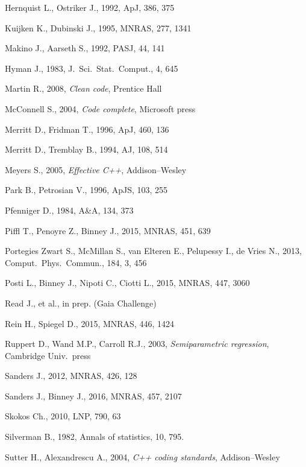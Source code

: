 \documentclass[12pt]{article}
\begin{document}
\begin{thebibliography}{99}
Hernquist L., Ostriker J., 1992, ApJ, 386, 375

Kuijken K., Dubinski J., 1995, MNRAS, 277, 1341

Makino J., Aarseth S., 1992, PASJ, 44, 141

Hyman J., 1983, J.~Sci.~Stat.~Comput., 4, 645

Martin R., 2008, \textsl{Clean code}, Prentice Hall

McConnell S., 2004, \textsl{Code complete}, Microsoft press

Merritt D., Fridman T., 1996, ApJ, 460, 136

Merritt D., Tremblay B., 1994, AJ, 108, 514

Meyers S., 2005, \textsl{Effective C++}, Addison--Wesley

Park B., Petrosian V., 1996, ApJS, 103, 255

Pfenniger D., 1984, A\&A, 134, 373

Piffl T., Penoyre Z., Binney J., 2015, MNRAS, 451, 639

Portegies Zwart S., McMillan S., van Elteren E., Pelupessy I., de Vries N., 2013, Comput.\ Phys.\ Commun., 184, 3, 456

Posti L., Binney J., Nipoti C., Ciotti L., 2015, MNRAS, 447, 3060

Read J., et al., in prep. (Gaia Challenge)

Rein H., Spiegel D., 2015, MNRAS, 446, 1424

Ruppert D., Wand M.P., Carroll R.J., 2003, \textsl{Semiparametric regression}, Cambridge Univ.\ press

Sanders J., 2012, MNRAS, 426, 128

Sanders J., Binney J., 2016, MNRAS, 457, 2107

Skokos Ch., 2010, LNP, 790, 63

Silverman B., 1982, Annals of statistics, 10, 795.

Sutter H., Alexandrescu A., 2004, \textsl{C++ coding standards}, Addison--Wesley


\end{thebibliography}
\end{document}
